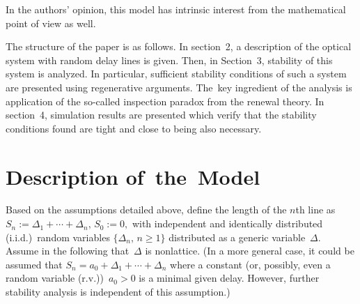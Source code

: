 \begin{multicols}{2}
In the authors' opinion, this model has intrinsic interest from the
mathematical point of view as well.

The structure of the paper is as follows. In section~2, a description
of the optical system with random delay lines  is given. Then, in
Section~3,  stability of this system is analyzed. In particular,
sufficient stability conditions of such a system are presented using
regenerative arguments. The~key ingredient of the analysis is 
application of the so-called inspection paradox from the renewal
theory. In section~4, simulation results are presented which verify
that the  stability conditions found are tight and close to being also
necessary.


\section{Description of~the~Model}

\noindent
Based on the assumptions detailed above, define the length  of
the $n$th line as $S_n:= \Delta_1+\cdots+\Delta_n,\,S_0:=0,$ with
independent and identically distributed (i.i.d.)\ random variables
$\{\Delta_n,\,n\ge 1\}$
 distributed as a generic variable~$\Delta$.
Assume in the following that~$\Delta$ is nonlattice.
 (In a more general case, it
could  be assumed that  $S_n= a_0+ \Delta_1+\cdots+\Delta_n$ where
a constant (or, possibly, even a random variable (r.v.))\ $a_0>0$ is a minimal
given delay. However, further stability analysis is independent of
this assumption.)



\end{multicols}
